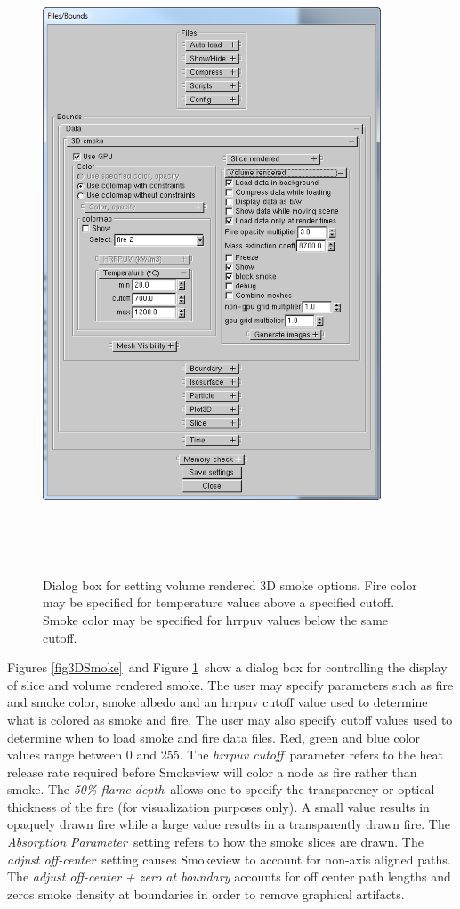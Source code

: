 \documentclass[11pt,twoside]{book}
\begin{document}
\begin{figure}[bph]
\centerline{\includegraphics[width=3.958333in]{FIGURES/fig3DSmokeB}
}\ \caption[Dialog Box for setting volume rendered 3D smoke
options] {Dialog box for setting volume rendered 3D smoke options.
Fire color may be specified for temperature values above a specified cutoff.
Smoke color may be specified for hrrpuv values below the same cutoff.
}\ \label{fig3DSmokeB}
\end{figure}
Figures \ref{fig3DSmoke}\ and Figure \ref{fig3DSmokeB}\ show a dialog box for controlling the display of
slice and volume rendered smoke.
The user may specify parameters such as fire and smoke color, smoke albedo and an hrrpuv cutoff value used
to determine what is colored as smoke and fire.  The user may also specify cutoff values used to determine when to load smoke
and fire data files.
Red, green and blue color values range between 0 and 255.
The {\em hrrpuv cutoff}\ parameter refers to
the heat release rate required before Smokeview will
color a node as fire rather than smoke. The {\em 50\% flame
depth}\ allows one to specify the transparency or optical thickness
of the fire (for visualization purposes only). A small value
results in opaquely drawn fire while a large value results in a
transparently drawn fire. The {\em Absorption Parameter}\ setting
refers to how the smoke slices are drawn.  The {\em adjust
off-center}\ setting causes Smokeview to account for non-axis
aligned paths. The {\em adjust off-center + zero at boundary}
accounts for off center path lengths and zeros smoke density at
boundaries in order to remove graphical artifacts.
\end{document}
